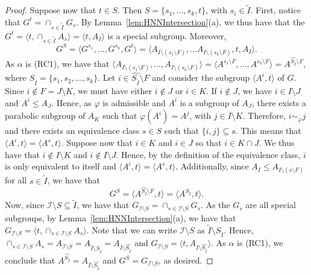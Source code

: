 \documentclass[11pt,letterpaper]{amsart}
\newcommand{\II}{\mathcal{I}}
\begin{document}
\begin{proof}
    
    Suppose now that $t\in S$. Then $S=\{s_1,\ldots, s_k, t\}$, with $s_i\in \widetilde{I}$. First, notice that $G^t = \cap_{s\in \widetilde{I}}G_s$. By Lemma~\ref{lem:HNNIntersection}(a), we thus have that the $G^t = \langle t, \cap_{s\in \widetilde{I}}A_s\rangle = \langle t, A_I\rangle$ is a special subgroup.
    Moreover, $$G^S = \langle G^{s_1}, \ldots, G^{s_k}, G^t\rangle = \langle A_{I\setminus (s_1\setminus F)},\ldots A_{I\setminus (s_k\setminus F)}, t, A_I \rangle.$$
   As $\alpha$ is (RC1), we have that $\langle A_{I\setminus (s_1\setminus F)},\ldots, A_{I\setminus (s_k\setminus F)} \rangle = \langle A^{s_1\setminus F},\ldots, A^{s_k\setminus F}\rangle = A^{\widehat{S_{\widetilde{I}}}\setminus F}$, where $S_{\widetilde{I}} = \{s_1,s_2,\ldots,s_k\}$.
   Let $i\in \widehat{S_{\widetilde{I}}}\setminus F$ and consider the  subgroup $\langle A^{i},t\rangle$ of $G$. Since $i\notin F= J\setminus K$, we must have either $i\notin J$ or $ i\in K$. If $i\notin J$, we have $i\in I\setminus J$ and $A^i\leq A_J$. Hence, as $\varphi$ is admissible and $A^i$ is a subgroup of $A_J$, there exists a parabolic subgroup of $A_K$ such that $\varphi(A^i)=A^j$, with $j\in I\setminus K$. Therefore, $i\sim_\varphi j$ and there exists an equivalence class $s\in S$ such that $\{i,j\}\subseteq s$. This means that $\langle A^i, t\rangle = \langle A^s, t\rangle$.
   Suppose now that $i\in K$ and $i\in J$ so that $i \in K \cap J$. We thus have that $i\notin I\setminus K$ and $i\notin I\setminus J$. Hence, by the definition of the equivalence class, $i$ is only equivalent to itself and
    $\langle A^i, t\rangle = \langle A^s, t\rangle$.
   Additionally, since $A_I\leq A_{I\setminus (s\setminus F)}$ for all $s\in \widetilde{I}$, we have that $$G^S = \langle A^{\widehat{S_{ \widetilde{I}}}\setminus F}, t\rangle = \langle A^{\widehat{S_{ \widetilde{I}}}}, t\rangle.$$
    Now, since $\II\setminus S\subseteq \widetilde{I}$, we have that $G_{\II\setminus S}= \cap_{s\in \II\setminus S} G_s$. As the $G_s$ are all special subgroups, by Lemma~\ref{lem:HNNIntersection}(a), we have that $G_{\II\setminus S} = \langle t, \cap_{s\in \II\setminus S} A_s\rangle$.
    Note that we can write $\II\setminus S$ as $\widetilde{I}\setminus S_{\widetilde{I}}$. Hence, $\cap_{s\in \II\setminus S} A_s = A_{\II\setminus S}=A_{\widetilde{I}\setminus S_{\widetilde{I}}}=A_{I\setminus \widehat{S_{\widetilde{I}}}}$ and $G_{\II\setminus S}=\langle t, A_{I\setminus \widehat{S_{\widetilde{I}}}}\rangle$. As $\alpha$ is (RC1), we conclude that $A^{\widehat{S_{ \widetilde{I}}}}=A_{I\setminus \widehat{S_{\widetilde{I}}}}$ and $G^S=G_{\II\setminus S}$, as desired. 
\end{proof}
\end{document}
